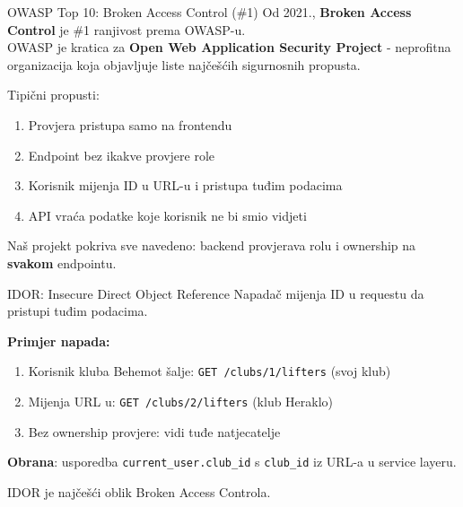 \begin{frame}{OWASP Top 10: Broken Access Control (\#1)}
Od 2021., \textbf{Broken Access Control} je \#1 ranjivost prema OWASP-u. \\
OWASP je kratica za \textbf{Open Web Application Security Project} - neprofitna organizacija koja objavljuje liste najčešćih sigurnosnih propusta.

\vspace{0.6em}
Tipični propusti:
\begin{enumerate}
  \item Provjera pristupa samo na frontendu
  \item Endpoint bez ikakve provjere role
  \item Korisnik mijenja ID u URL-u i pristupa tuđim podacima
  \item API vraća podatke koje korisnik ne bi smio vidjeti
\end{enumerate}

\vspace{0.6em}
Naš projekt pokriva sve navedeno: backend provjerava rolu i ownership na \textbf{svakom} endpointu.
\end{frame}

\begin{frame}{IDOR: Insecure Direct Object Reference}
Napadač mijenja ID u requestu da pristupi tuđim podacima.

\vspace{0.6em}
\textbf{Primjer napada:}
\begin{enumerate}
  \item Korisnik kluba Behemot šalje: \texttt{GET /clubs/1/lifters} (svoj klub)
  \item Mijenja URL u: \texttt{GET /clubs/2/lifters} (klub Heraklo)
  \item Bez ownership provjere: vidi tuđe natjecatelje
\end{enumerate}

\vspace{0.6em}
\textbf{Obrana}: usporedba \texttt{current\_user.club\_id} s \texttt{club\_id} iz URL-a u service layeru.

\vspace{0.4em}
IDOR je najčešći oblik Broken Access Controla.
\end{frame}

